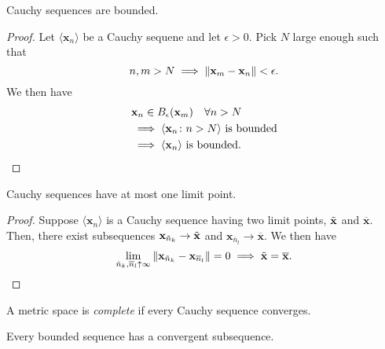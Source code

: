 \begin{prop}
    Cauchy sequences are bounded.
\end{prop}
\begin{proof}
    Let $\langle \mathbf{x}_n \rangle$ be a Cauchy sequene and let $\epsilon > 0$. Pick $N$ large enough such that 
    \[
        n,m > N \implies \norm{\mathbf{x}_m - \mathbf{x}_n} < \epsilon.
    \]
    We then have
    \begin{align*}
        &\mathbf{x}_n \in B_{\epsilon}(\mathbf{x}_m) \quad \forall n > N \\
        &\implies \langle \mathbf{x}_n \colon n > N\rangle \text{ is bounded} \\
        &\implies \langle \mathbf{x}_n \rangle \text{ is bounded.} \qedhere
    \end{align*}
\end{proof} 
\begin{prop}
    Cauchy sequences have at most one limit point.
\end{prop}
\begin{proof}
    Suppose $\langle \mathbf{x}_n \rangle$ is a Cauchy sequence having two limit points, $\Tilde{\mathbf{x}}$ and $\overline{\mathbf{x}}$. Then, there exist subsequences $\mathbf{x}_{\Tilde{n}_k} \to \Tilde{\mathbf{x}}$ and $\mathbf{x}_{\overline{n}_l} \to \overline{\mathbf{x}}$. We then have
    \[
        \lim_{\Tilde{n}_k, \overline{n}_l \uparrow \infty} \norm{\mathbf{x}_{\Tilde{n}_k} - \mathbf{x}_{\overline{n}_l}} = 0 \implies \Tilde{\mathbf{x}} = \overline{\mathbf{x}}. \qedhere
    \]
\end{proof}
\begin{defn}
    A metric space is \emph{complete} if every Cauchy sequence converges.
\end{defn}

\begin{thm}
    Every bounded sequence has a convergent subsequence.
\end{thm}